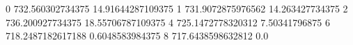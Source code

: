 0 732.560302734375 14.91644287109375
1 731.9072875976562 14.263427734375
2 736.200927734375 18.55706787109375
4 725.1472778320312 7.50341796875
6 718.2487182617188 0.6048583984375
8 717.6438598632812 0.0
